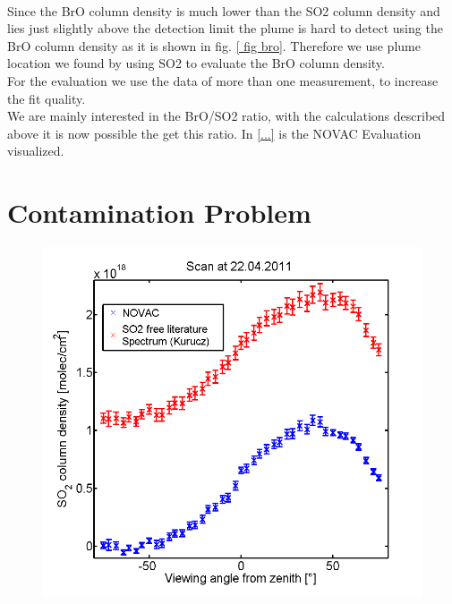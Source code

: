 \documentclass  [
  paper    = a4,
  BCOR     = 10mm,
  twoside,
  fontsize = 12pt,
  fleqn,
  toc      = bibnumbered,
  toc      = listofnumbered,
  numbers  = noendperiod,
  headings = normal,
  listof   = leveldown,
  version  = 3.03
]                                       {scrreprt}
\begin{document}
	\\
	Since the BrO column density is much lower than the SO2 column density and lies just slightly above the detection limit the plume is hard to detect using the BrO column density as it is shown in fig. \ref{ fig bro}. 
	Therefore we use plume location we found by using SO2 to evaluate the BrO column density.\\
	For the evaluation we use the data of more than one measurement, to increase the fit quality.\\
	We are mainly interested in the BrO/SO2 ratio, with the calculations described above it is now possible the get this ratio.
	In \cref{...} is the NOVAC Evaluation visualized.
	
	

	\section{Contamination Problem}
	\begin{figure}
		\centering
		\includegraphics[width=0.7\linewidth]{Bilder/contaminated}
		\caption{}
		\label{fig:contaminated}
	\end{figure}
	
\end{document}
